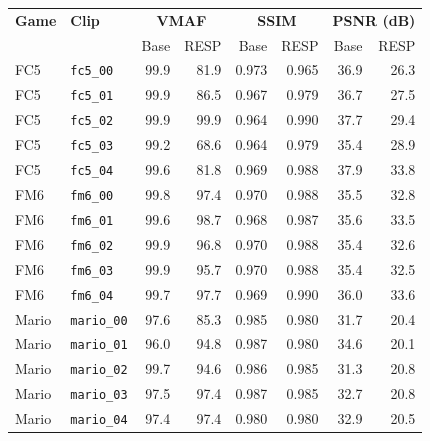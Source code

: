 \begin{tabular}{@{}llrrrrrr@{}}
\toprule
\textbf{Game} & \textbf{Clip} & \multicolumn{2}{c}{\textbf{VMAF}} & \multicolumn{2}{c}{\textbf{SSIM}} & \multicolumn{2}{c}{\textbf{PSNR (dB)}} \\
 & & Base & RESP & Base & RESP & Base & RESP \\
\midrule
FC5 & \texttt{fc5\_00} & 99.9 & 81.9 & 0.973 & 0.965 & 36.9 & 26.3 \\
FC5 & \texttt{fc5\_01} & 99.9 & 86.5 & 0.967 & 0.979 & 36.7 & 27.5 \\
FC5 & \texttt{fc5\_02} & 99.9 & 99.9 & 0.964 & 0.990 & 37.7 & 29.4 \\
FC5 & \texttt{fc5\_03} & 99.2 & 68.6 & 0.964 & 0.979 & 35.4 & 28.9 \\
FC5 & \texttt{fc5\_04} & 99.6 & 81.8 & 0.969 & 0.988 & 37.9 & 33.8 \\
\midrule
FM6 & \texttt{fm6\_00} & 99.8 & 97.4 & 0.970 & 0.988 & 35.5 & 32.8 \\
FM6 & \texttt{fm6\_01} & 99.6 & 98.7 & 0.968 & 0.987 & 35.6 & 33.5 \\
FM6 & \texttt{fm6\_02} & 99.9 & 96.8 & 0.970 & 0.988 & 35.4 & 32.6 \\
FM6 & \texttt{fm6\_03} & 99.9 & 95.7 & 0.970 & 0.988 & 35.4 & 32.5 \\
FM6 & \texttt{fm6\_04} & 99.7 & 97.7 & 0.969 & 0.990 & 36.0 & 33.6 \\
\midrule
Mario & \texttt{mario\_00} & 97.6 & 85.3 & 0.985 & 0.980 & 31.7 & 20.4 \\
Mario & \texttt{mario\_01} & 96.0 & 94.8 & 0.987 & 0.980 & 34.6 & 20.1 \\
Mario & \texttt{mario\_02} & 99.7 & 94.6 & 0.986 & 0.985 & 31.3 & 20.8 \\
Mario & \texttt{mario\_03} & 97.5 & 97.4 & 0.987 & 0.985 & 32.7 & 20.8 \\
Mario & \texttt{mario\_04} & 97.4 & 97.4 & 0.980 & 0.980 & 32.9 & 20.5 \\
\bottomrule
\end{tabular}
